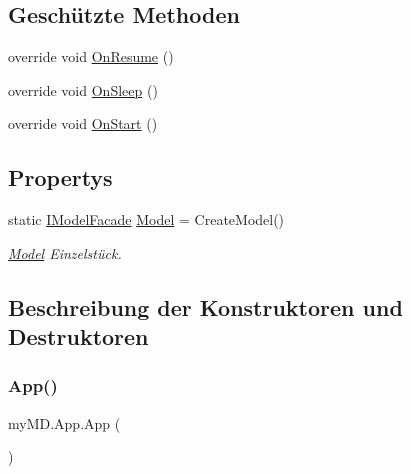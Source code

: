 \subsection*{Geschützte Methoden}
\begin{DoxyCompactItemize}
\item 
override void \mbox{\hyperlink{classmy_m_d_1_1_app_a91bca8ea68e636005ac155569744ba2d}{On\+Resume}} ()
\item 
override void \mbox{\hyperlink{classmy_m_d_1_1_app_a064df001dcc1f30d31c9608d4f14d393}{On\+Sleep}} ()
\item 
override void \mbox{\hyperlink{classmy_m_d_1_1_app_a0c1dfd4bcf4e5071d38479c6df881bc0}{On\+Start}} ()
\end{DoxyCompactItemize}
\subsection*{Propertys}
\begin{DoxyCompactItemize}
\item 
static \mbox{\hyperlink{interfacemy_m_d_1_1_model_interface_1_1_model_facade_interface_1_1_i_model_facade}{I\+Model\+Facade}} \mbox{\hyperlink{classmy_m_d_1_1_app_ab2df3a78e1379092a4298dc2c50e95bc}{Model}} = Create\+Model()
\begin{DoxyCompactList}\small\item\em \mbox{\hyperlink{namespacemy_m_d_1_1_model}{Model}} Einzelstück. \end{DoxyCompactList}\end{DoxyCompactItemize}


\subsection{Beschreibung der Konstruktoren und Destruktoren}
\mbox{\label{classmy_m_d_1_1_app_aade00a34203636478b102999b7bb5c51}} 
\subsubsection{\texorpdfstring{App()}{App()}}
{\footnotesize\ttfamily my\+M\+D.\+App.\+App (\begin{DoxyParamCaption}{ }\end{DoxyParamCaption})}



